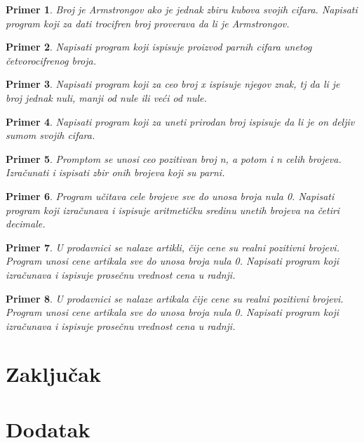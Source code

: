 \documentclass[a4paper]{article}
\newtheorem{primer}{Primer}[section]
\begin{document}
\begin{primer}
Broj je Armstrongov ako je jednak zbiru kubova svojih
cifara. Napisati program koji za dati trocifren broj proverava da li je Armstrongov.
\end{primer}

\begin{primer}
Napisati program koji ispisuje proizvod parnih cifara unetog
četvorocifrenog broja.
\end{primer}

\begin{primer}
Napisati program koji za ceo broj x ispisuje njegov
znak, tj da li je broj jednak nuli, manji od nule ili veći od nule.
\end{primer}

\begin{primer}
Napisati program koji za uneti prirodan broj ispisuje da li
je on deljiv sumom svojih cifara.
\end{primer}

\begin{primer}
Promptom se unosi ceo pozitivan broj n, a potom i n celih
brojeva. Izračunati i ispisati zbir onih brojeva koji su parni.
\end{primer}

\begin{primer}
Program učitava cele brojeve sve do unosa broja nula 0.
Napisati program koji izračunava i ispisuje aritmetičku sredinu unetih brojeva na
četiri decimale.
\end{primer}

\begin{primer}
U prodavnici se nalaze artikli, čije cene su realni pozitivni
brojevi. Program unosi cene artikala sve do unosa broja nula 0. Napisati program
koji izračunava i ispisuje prosečnu vrednost cena u radnji.
\end{primer}

\begin{primer}
U prodavnici se nalaze artikala čije cene su realni pozitivni
brojevi. Program unosi cene artikala sve do unosa broja nula 0. Napisati program
koji izračunava i ispisuje prosečnu vrednost cena u radnji.
\end{primer}




\section{Zaključak}
\label{sec:zakljucak}

 


\appendix
\section{Dodatak}
\end{document}
